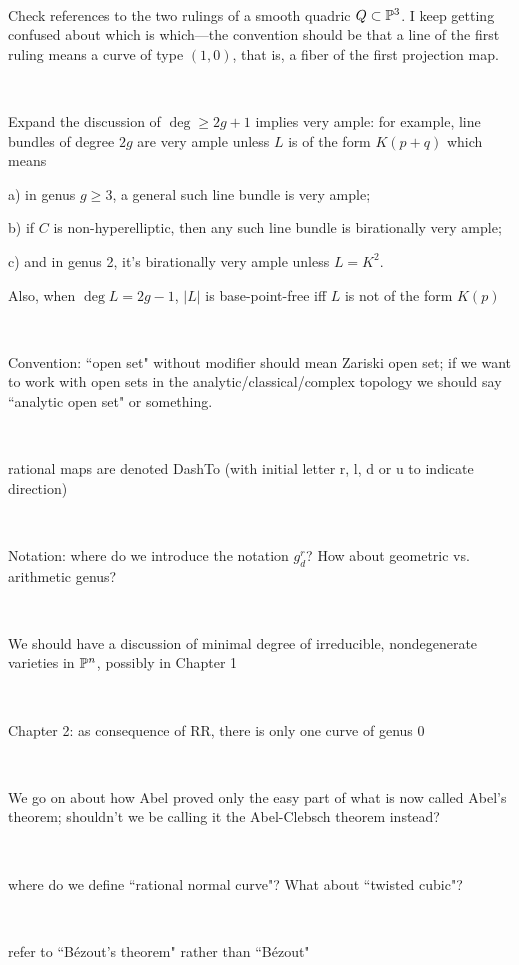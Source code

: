 \documentclass[12pt, leqno]{book}
\begin{document}
\

Check references to the two rulings of a smooth quadric $Q \subset \PP^3$. I keep getting confused about which is which---the convention should be that a line of the first ruling means a curve of type $(1,0)$, that is, a fiber of the first projection map.

\

Expand the discussion of $\deg \geq 2g+1$ implies very ample: for example, line bundles of degree $2g$ are very ample unless $L$ is of the form $K(p+q)$ which means 

a) in genus $g \geq 3$, a general such line bundle is very ample; 

b) if $C$ is non-hyperelliptic, then any such line bundle is birationally very ample;

c) and in genus 2, it's birationally very ample unless $L = K^2$.

Also, when $\deg L = 2g-1$, $|L|$ is base-point-free iff $L$ is not of the form $K(p)$

\

Convention: ``open set" without modifier should mean Zariski open set; if we want to work with open sets in the analytic/classical/complex topology we should say ``analytic open set" or something.

\

rational maps are denoted DashTo (with initial letter r, l, d or u to indicate direction)

\

Notation: where do we introduce the notation $g^r_d$? How about geometric vs. arithmetic genus?

\

We should have a discussion of minimal degree of irreducible, nondegenerate varieties in $\PP^n$, possibly in Chapter 1

\

Chapter 2: as consequence of RR, there is only one curve of genus 0

\

We go on about how Abel proved only the easy part of what is now called Abel's theorem; shouldn't we be calling it the Abel-Clebsch theorem instead?

\

where do we define ``rational normal curve"? What about ``twisted cubic"?

\

refer to ``B\' ezout's theorem" rather than ``B\' ezout"

\
\end{document}
